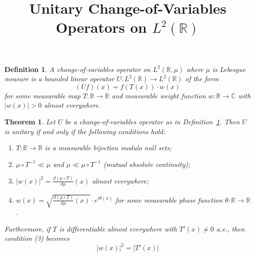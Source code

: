 \documentclass{article}
\newcommand{\tmem}[1]{{\em #1\/}}
\newtheorem{definition}{Definition}
\newtheorem{theorem}{Theorem}
\begin{document}
\title{Unitary Change-of-Variables Operators on $L^2 (\mathbb{R})$}

\date{}

\maketitle

\begin{definition}
  \label{def:cov-operator}A {\tmem{change-of-variables operator}} on $L^2
  (\mathbb{R}, \mu)$ where $\mu$ is Lebesgue measure is a bounded linear
  operator $U : L^2 (\mathbb{R}) \to L^2 (\mathbb{R})$ of the form
  \begin{equation}
    (Uf) (x) = f (T (x)) \cdot w (x)
  \end{equation}
  for some measurable map $T : \mathbb{R} \to \mathbb{R}$ and measurable
  weight function $w : \mathbb{R} \to \mathbb{C}$ with $|w (x) | > 0$ almost
  everywhere.
\end{definition}

\begin{theorem}
  \label{thm:main}Let $U$ be a change-of-variables operator as in
  Definition~\ref{def:cov-operator}. Then $U$ is unitary if and only if the
  following conditions hold:
  \begin{enumerate}
    \item $T : \mathbb{R} \to \mathbb{R}$ is a measurable bijection modulo
    null sets;
    
    \item $\mu \circ T^{- 1} \ll \mu$ and $\mu \ll \mu \circ T^{- 1}$ (mutual
    absolute continuity);
    
    \item $|w (x) |^2 = \frac{d (\mu \circ T)}{d \mu} (x)$ almost everywhere;
    
    \item $w (x) = \sqrt{\frac{d (\mu \circ T)}{d \mu} (x)} \cdot e^{i \theta
    (x)}$ for some measurable phase function $\theta : \mathbb{R} \to
    \mathbb{R}$.
  \end{enumerate}
  Furthermore, if $T$ is differentiable almost everywhere with $T' (x) \neq 0$
  a.e., then condition (3) becomes
  \begin{equation}
    |w (x) |^2 = |T' (x) |
  \end{equation}
  {\cdot}
\end{theorem}
\end{document}
